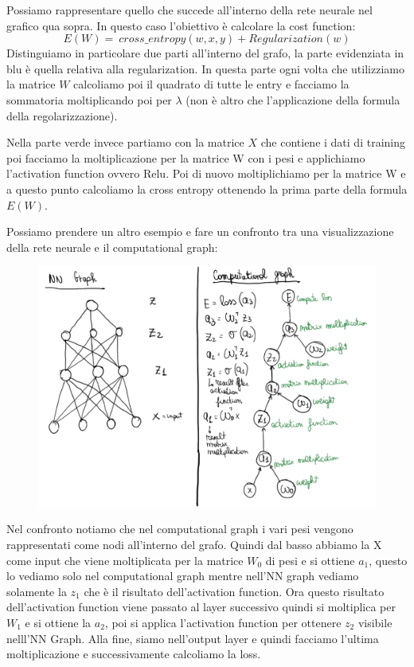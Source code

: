 \documentclass[14pt]{extreport}
\begin{document}
Possiamo rappresentare quello che succede all'interno della rete neurale nel grafico qua sopra. In questo caso l'obiettivo è calcolare la cost
function: $$E(W) = \ cross\_entropy(w,x,y) + Regularization(w)$$ Distinguiamo in particolare due parti all'interno del grafo, la parte evidenziata in
blu è quella relativa alla regularization. In questa parte ogni volta che utilizziamo la matrice $W$ calcoliamo poi il quadrato di tutte le entry e
facciamo la sommatoria moltiplicando poi per $\lambda$ (non è altro che l'applicazione della formula della regolarizzazione). 

Nella parte verde invece partiamo con la matrice $X$ che contiene i dati di training poi facciamo la moltiplicazione per la matrice W con i pesi e
applichiamo l'activation function ovvero Relu. Poi di nuovo moltiplichiamo per la matrice W e a questo punto calcoliamo la cross entropy ottenendo la
prima parte della formula $E(W)$.


Possiamo prendere un altro esempio e fare un confronto tra una visualizzazione della rete neurale e il computational graph:

\begin{figure}[H]
\centering
\includegraphics[width=\linewidth]{397.jpeg}
\end{figure}

Nel confronto notiamo che nel computational graph i vari pesi vengono rappresentati come nodi all'interno del grafo. Quindi dal basso abbiamo la X
come input che viene moltiplicata per la matrice $W_0$ di pesi e si ottiene $a_1$, questo lo vediamo solo nel computational graph mentre nell'NN graph
vediamo solamente la $z_1$ che è il risultato dell'activation function. Ora questo risultato dell'activation function viene passato al layer
successivo quindi si moltiplica per $W_1$ e si ottiene la $a_2$, poi si applica l'activation function per ottenere $z_2$ visibile nelll'NN Graph. Alla
fine, siamo nell'output layer e quindi facciamo l'ultima moltiplicazione e successivamente calcoliamo la loss.
\end{document}
